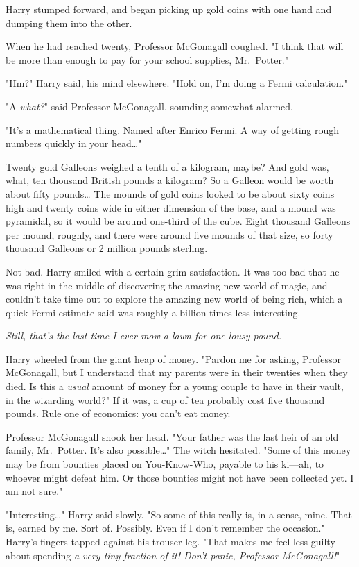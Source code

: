 Harry stumped forward, and began picking up gold coins with one hand and 
dumping them into the other.

When he had reached twenty, Professor McGonagall coughed. "I think that will be 
more than enough to pay for your school supplies, Mr.~Potter."

"Hm?" Harry said, his mind elsewhere. "Hold on, I'm doing a Fermi calculation."

"A \emph{what?}" said Professor McGonagall, sounding somewhat alarmed.

"It's a mathematical thing. Named after Enrico Fermi. A way of getting rough 
numbers quickly in your head{\ldots}"

Twenty gold Galleons weighed a tenth of a kilogram, maybe? And gold was, what, 
ten thousand British pounds a kilogram? So a Galleon would be worth about fifty 
pounds{\ldots} The mounds of gold coins looked to be about sixty coins high and 
twenty coins wide in either dimension of the base, and a mound was pyramidal, 
so it would be around one-third of the cube. Eight thousand Galleons per mound, 
roughly, and there were around five mounds of that size, so forty thousand 
Galleons or 2 million pounds sterling.

Not bad. Harry smiled with a certain grim satisfaction. It was too bad that he 
was right in the middle of discovering the amazing new world of magic, and 
couldn't take time out to explore the amazing new world of being rich, which a 
quick Fermi estimate said was roughly a billion times less interesting.

\emph{Still, that's the last time I ever mow a lawn for one lousy pound.}

Harry wheeled from the giant heap of money. "Pardon me for asking, Professor 
McGonagall, but I understand that my parents were in their twenties when they 
died. Is this a \emph{usual} amount of money for a young couple to have in 
their vault, in the wizarding world?" If it was, a cup of tea probably cost 
five thousand pounds. Rule one of economics: you can't eat money.

Professor McGonagall shook her head. "Your father was the last heir of an old 
family, Mr.~Potter. It's also possible{\ldots}" The witch hesitated. "Some of 
this money may be from bounties placed on You-Know-Who, payable to his ki---ah, 
to whoever might defeat him. Or those bounties might not have been collected 
yet. I am not sure."

"Interesting{\ldots}" Harry said slowly. "So some of this really is, in a 
sense, mine. That is, earned by me. Sort of. Possibly. Even if I don't remember 
the occasion." Harry's fingers tapped against his trouser-leg. "That makes me 
feel less guilty about spending \emph{a very tiny fraction of it! Don't panic, 
Professor McGonagall!}"

